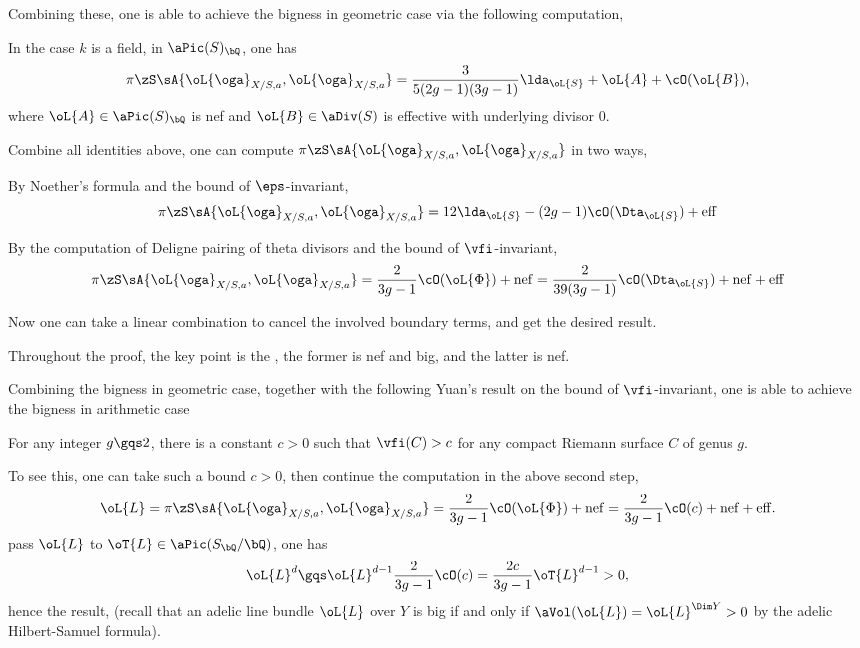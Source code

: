 \documentclass[a4paper, twoside]{article}
\begin{document}
Combining these, one is able to achieve the bigness in geometric case via the following computation,
\begin{thm}[Theorem~3.8]
	In the case $k$ is a field, in $\aPic(S)_{\bQ}$, one has
	\[
		\pi\zS\sA{\oL{\oga}_{X/S,a},\oL{\oga}_{X/S,a}}=\frac{3}{5(2g-1)(3g-1)}\lda_{\oL{S}}+\oL{A}+\cO(\oL{B}),
	\]
	where $\oL{A}\in\aPic(S)_{\bQ}$ is nef and $\oL{B}\in\aDiv(S)$ is effective with underlying divisor $0$.
\end{thm}

\begin{prf}
	Combine all identities above, one can compute $\pi\zS\sA{\oL{\oga}_{X/S,a},\oL{\oga}_{X/S,a}}$ in two ways,
	\begin{enr}
		\item By Noether's formula and the bound of $\eps$-invariant,
		\[
			\pi\zS\sA{\oL{\oga}_{X/S,a},\oL{\oga}_{X/S,a}}=12\lda_{\oL{S}}-(2g-1)\cO(\Dta_{\oL{S}})+ \mathrm{eff}
		\]
		\item By the computation of Deligne pairing of theta divisors and the bound of $\vfi$-invariant,
		\[
			\pi\zS\sA{\oL{\oga}_{X/S,a},\oL{\oga}_{X/S,a}}=\frac{2}{3g-1}\cO(\oL{\Phi})+ \mathrm{nef}=\frac{2}{39(3g-1)}\cO(\Dta_{\oL{S}})+ \mathrm{nef} + \mathrm{eff}
		\]
	\end{enr}
	Now one can take a linear combination to cancel the involved boundary terms, and get the desired result.
\end{prf}

\begin{rmk}
	Throughout the proof, the key point is the , the former is nef and big, and the latter is nef.
\end{rmk}

Combining the bigness in geometric case, together with the following Yuan's result on the bound of $\vfi$-invariant, one is able to achieve the bigness in arithmetic case

\begin{thm}[Theorem~3.9]
	For any integer $g\gqs2$, there is a constant $c>0$ such that $\vfi(C)>c$ for any compact Riemann surface $C$ of genus $g$.
\end{thm}

To see this, one can take such a bound $c>0$, then continue the computation in the above second step,
\[
	\oL{L}=\pi\zS\sA{\oL{\oga}_{X/S,a},\oL{\oga}_{X/S,a}}=\frac{2}{3g-1}\cO(\oL{\Phi})+ \mathrm{nef}=\frac{2}{3g-1}\cO(c)+ \mathrm{nef}+ \mathrm{eff}.
\]
pass $\oL{L}$ to $\oT{L}\in\aPic(S_{\bQ}/\bQ)$, one has
\[
	\oL{L}^{d}\gqs\oL{L}^{d-1}\frac{2}{3g-1}\cO(c)=\frac{2c}{3g-1}\oT{L}^{d-1}>0,
\]
hence the result, (recall that an adelic line bundle $\oL{L}$ over $Y$ is big if and only if $\aVol(\oL{L})=\oL{L}^{\Dim Y}>0$ by the adelic Hilbert-Samuel formula).
\end{document}
